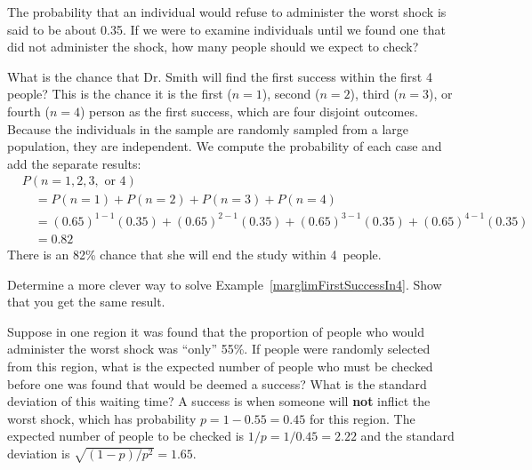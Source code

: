 \begin{exercisewrap}
\begin{nexercise}
The probability that an individual would refuse to administer the worst shock is said to be about 0.35. If we were to examine individuals until we found one that did not administer the shock, how many people should we expect to check?\footnotemark{}
\end{nexercise}
\end{exercisewrap}

\begin{examplewrap}
\begin{nexample}{What is the chance that Dr. Smith will find the first success within the first 4 people?} \label{marglimFirstSuccessIn4}
This is the chance it is the first ($n=1$), second ($n=2$), third ($n=3$), or fourth ($n=4$) person as the first success, which are four disjoint outcomes. Because the individuals in the sample are randomly sampled from a large population, they are independent. We compute the probability of each case and add the separate results:
\begin{align*}
&P(n=1, 2, 3,\text{ or }4) \\
  & \quad = P(n=1)+P(n=2)+P(n=3)+P(n=4) \\
  & \quad = (0.65)^{1-1}(0.35) + (0.65)^{2-1}(0.35) + (0.65)^{3-1}(0.35) + (0.65)^{4-1}(0.35) \\
  & \quad = 0.82
\end{align*}
There is an 82\% chance that she will end the study within 4~people.
\end{nexample}
\end{examplewrap}

\begin{exercisewrap}
\begin{nexercise}
Determine a more clever way to solve Example~\ref{marglimFirstSuccessIn4}. Show that you get the same result.\footnotemark
\end{nexercise}
\end{exercisewrap}

\begin{examplewrap}
\begin{nexample}{Suppose in one region it was found that the proportion of people who would administer the worst shock was ``only'' 55\%. If people were randomly selected from this region, what is the expected number of people who must be checked before one was found that would be deemed a success? What is the standard deviation of this waiting time?} \label{onlyShocking55PercOfTheTimeExample}
A success is when someone will \textbf{not} inflict the worst shock, which has probability $p=1-0.55=0.45$ for this region. The expected number of people to be checked is $1/p = 1/0.45 = 2.22$ and the standard deviation is $\sqrt{(1-p)/p^2} = 1.65$.
\end{nexample}
\end{examplewrap}

